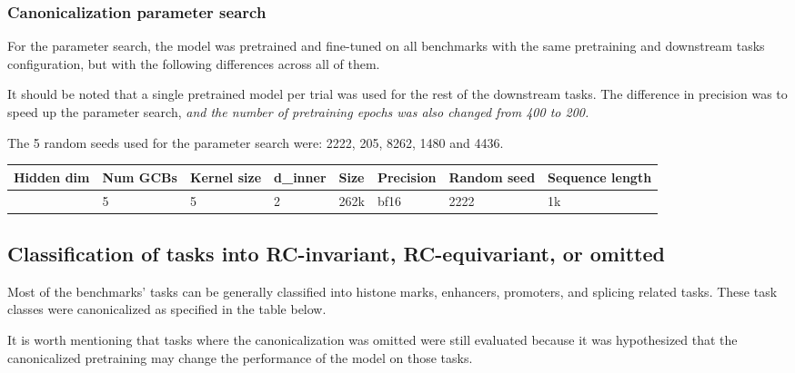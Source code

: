 \documentclass[   ]{article}
\begin{document}
\subsubsection{Canonicalization parameter search}\label{hyperparameter-search}

For the parameter search, the model was pretrained and fine-tuned
on all benchmarks with the same pretraining and downstream tasks
configuration, but with the following differences across all of them.

It should be noted that a single pretrained model per trial was used for
the rest of the downstream tasks. The difference in precision was to speed up the parameter search, \emph{and the number of pretraining epochs was also changed from 400 to 200.}

The 5 random seeds used for the parameter search were: 2222, 205, 8262, 1480 and 4436.

{\def\LTcaptype{none} %
	\begin{longtable}[]{@{}llllllll@{}}
		\toprule\noalign{}
		Hidden dim & Num GCBs & Kernel size & d\_inner & Size & Precision & Random seed & Sequence length \\
		\midrule\noalign{}
		\endhead
		\bottomrule\noalign{}
		\endlastfoot
		64 & 5 & 5 & 2 & 262k & bf16 & 2222 & 1k \\
	\end{longtable}
}

\subsection{Classification of tasks into RC-invariant, RC-equivariant, or omitted}
\label{sec:downstream-task-canon-classification}

Most of the benchmarks' tasks can be generally classified into histone
marks, enhancers, promoters, and splicing related tasks. These task classes were
canonicalized as specified in the table below.

It is worth mentioning that tasks where the canonicalization was omitted were still evaluated because it was hypothesized that the canonicalized pretraining may change the performance of the model on those tasks.
\end{document}
